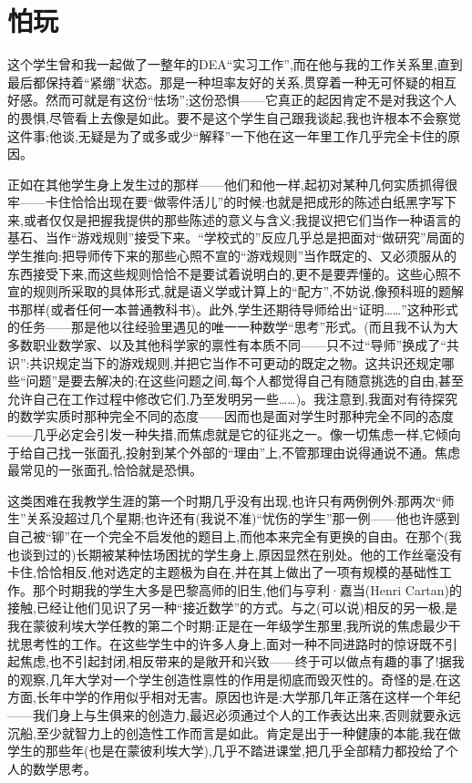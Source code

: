 \section{怕玩}

这个学生曾和我一起做了一整年的DEA“实习工作”,而在他与我的工作关系里,直到最后都保持着“紧绷”状态。那是一种坦率友好的关系,贯穿着一种无可怀疑的相互好感。然而可就是有这份“怯场”;这份恐惧——它真正的起因肯定不是对我这个人的畏惧,尽管看上去像是如此。要不是这个学生自己跟我谈起,我也许根本不会察觉这件事;他谈,无疑是为了或多或少“解释”一下他在这一年里工作几乎完全卡住的原因。

正如在其他学生身上发生过的那样——他们和他一样,起初对某种几何实质抓得很牢——卡住恰恰出现在要“做零件活儿”的时候:也就是把成形的陈述白纸黑字写下来,或者仅仅是把握我提供的那些陈述的意义与含义;我提议把它们当作一种语言的基石、当作“游戏规则”接受下来。“学校式的”反应几乎总是把面对“做研究”局面的学生推向:把导师传下来的那些心照不宣的“游戏规则”当作既定的、又必须服从的东西接受下来,而这些规则恰恰不是要试着说明白的,更不是要弄懂的。这些心照不宣的规则所采取的具体形式,就是语义学或计算上的“配方”,不妨说,像预科班的题解书那样(或者任何一本普通教科书)。此外,学生还期待导师给出“证明……”这种形式的任务——那是他以往经验里遇见的唯一一种数学“思考”形式。(而且我不认为大多数职业数学家、以及其他科学家的禀性有本质不同——只不过“导师”换成了“共识”:共识规定当下的游戏规则,并把它当作不可更动的既定之物。这共识还规定哪些“问题”是要去解决的;在这些问题之间,每个人都觉得自己有随意挑选的自由,甚至允许自己在工作过程中修改它们,乃至发明另一些……)。我注意到,我面对有待探究的数学实质时那种完全不同的态度——因而也是面对学生时那种完全不同的态度——几乎必定会引发一种失措,而焦虑就是它的征兆之一。像一切焦虑一样,它倾向于给自己找一张面孔,投射到某个外部的“理由”上,不管那理由说得通说不通。焦虑最常见的一张面孔,恰恰就是恐惧。

这类困难在我教学生涯的第一个时期几乎没有出现,也许只有两例例外:那两次“师生”关系没超过几个星期;也许还有(我说不准)“忧伤的学生”那一例——他也许感到自己被“铆”在一个完全不启发他的题目上,而他本来完全有更换的自由。在那个(我也谈到过的)长期被某种怯场困扰的学生身上,原因显然在别处。他的工作丝毫没有卡住,恰恰相反,他对选定的主题极为自在,并在其上做出了一项有规模的基础性工作。那个时期我的学生大多是巴黎高师的旧生,他们与亨利·嘉当(Henri Cartan)的接触,已经让他们见识了另一种“接近数学”的方式。与之(可以说)相反的另一极,是我在蒙彼利埃大学任教的第二个时期:正是在一年级学生那里,我所说的焦虑最少干扰思考性的工作。在这些学生中的许多人身上,面对一种不同进路时的惊讶既不引起焦虑,也不引起封闭,相反带来的是敞开和兴致——终于可以做点有趣的事了!据我的观察,几年大学对一个学生创造性禀性的作用是彻底而毁灭性的。奇怪的是,在这方面,长年中学的作用似乎相对无害。原因也许是:大学那几年正落在这样一个年纪——我们身上与生俱来的创造力,最迟必须通过个人的工作表达出来,否则就要永远沉船,至少就智力上的创造性工作而言是如此。肯定是出于一种健康的本能,我在做学生的那些年(也是在蒙彼利埃大学),几乎不踏进课堂,把几乎全部精力都投给了个人的数学思考。

